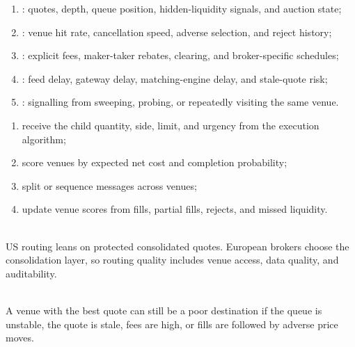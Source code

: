 \documentclass[a4paper,oneside,openany]{book}
\begin{document}
\begin{taxonomy} 
\begin{enumerate}[label=\roman*.]
\setlength{\itemsep}{0pt}
\item {}: quotes, depth, queue position, hidden-liquidity signals, and auction state;
\item {}: venue hit rate, cancellation speed, adverse selection, and reject history;
\item {}: explicit fees, maker-taker rebates, clearing, and broker-specific schedules;
\item {}: feed delay, gateway delay, matching-engine delay, and stale-quote risk;
\item {}: signalling from sweeping, probing, or repeatedly visiting the same venue.
\end{enumerate}
\end{taxonomy}

\begin{process} 
\begin{enumerate}[label=\roman*.]
\setlength{\itemsep}{0pt}
\item receive the child quantity, side, limit, and urgency from the execution algorithm;
\item score venues by expected net cost and completion probability;
\item split or sequence messages across venues;
\item update venue scores from fills, partial fills, rejects, and missed liquidity.
\end{enumerate}
\end{process}

\begin{principle} \\
US routing leans on protected consolidated quotes. European brokers choose the consolidation layer, so routing quality includes venue access, data quality, and auditability.
\end{principle}

\begin{caveat} \\
A venue with the best quote can still be a poor destination if the queue is unstable, the quote is stale, fees are high, or fills are followed by adverse price moves.
\end{caveat}
\end{document}
